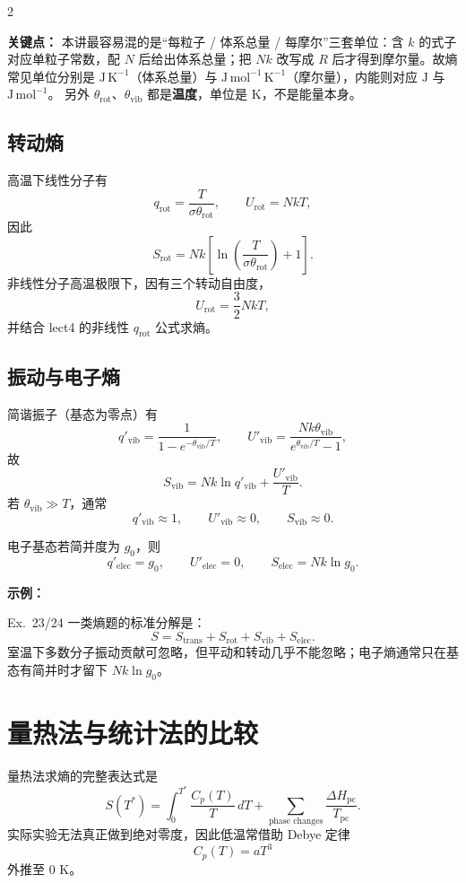 \documentclass[a4paper,9pt]{article}
\newenvironment{keypoint}
{\par\vspace{0.3em}\noindent\begin{tcolorbox}[colback=keybg,colframe=keycolor,boxrule=0.5pt,arc=2pt,left=2pt,right=2pt,top=2pt,bottom=2pt,boxsep=0pt]\noindent\textcolor{keycolor}{\textbf{关键点：}}}
{\end{tcolorbox}\par\vspace{0.3em}}
\newenvironment{examplebox}
{\par\vspace{0.3em}\noindent\begin{tcolorbox}[colback=boxbg,colframe=derivcolor,boxrule=0.5pt,arc=2pt,left=2pt,right=2pt,top=2pt,bottom=2pt,boxsep=0pt]\scriptsize\noindent\textcolor{derivcolor}{\textbf{示例：}}\par\setlength{\parskip}{0.1ex}\setlength{\itemsep}{0pt}\setlength{\parsep}{0pt}}
{\end{tcolorbox}\par\vspace{0.3em}}
\begin{document}
\begin{multicols}{2}
	\begin{keypoint}
		本讲最容易混的是“每粒子 / 体系总量 / 每摩尔”三套单位：含 $k$ 的式子对应单粒子常数，配 $N$ 后给出体系总量；把 $Nk$ 改写成 $R$ 后才得到摩尔量。故熵常见单位分别是 $\mathrm{J\,K^{-1}}$（体系总量）与 $\mathrm{J\,mol^{-1}\,K^{-1}}$（摩尔量），内能则对应 $\mathrm J$ 与 $\mathrm{J\,mol^{-1}}$。
		另外 $\theta_{\mathrm{rot}}$、$\theta_{\mathrm{vib}}$ 都是\textbf{温度}，单位是 K，不是能量本身。
	\end{keypoint}

	\subsection{转动熵}
	高温下线性分子有
	\[
		q_{\mathrm{rot}}=\frac{T}{\sigma\theta_{\mathrm{rot}}},
		\qquad U_{\mathrm{rot}}=NkT,
	\]
	因此
	\[
		S_{\mathrm{rot}}=Nk\left[\ln\left(\frac{T}{\sigma\theta_{\mathrm{rot}}}\right)+1\right].
	\]
	非线性分子高温极限下，因有三个转动自由度，
	\[
		U_{\mathrm{rot}}=\frac32NkT,
	\]
	并结合 lect4 的非线性 $q_{\mathrm{rot}}$ 公式求熵。

	\subsection{振动与电子熵}
	简谐振子（基态为零点）有
	\[
		q'_{\mathrm{vib}}=\frac{1}{1-e^{-\theta_{\mathrm{vib}}/T}},
		\qquad
		U'_{\mathrm{vib}}=\frac{Nk\theta_{\mathrm{vib}}}{e^{\theta_{\mathrm{vib}}/T}-1},
	\]
	故
	\[
		S_{\mathrm{vib}}=Nk\ln q'_{\mathrm{vib}}+\frac{U'_{\mathrm{vib}}}{T}.
	\]
	若 $\theta_{\mathrm{vib}}\gg T$，通常
	\[
		q'_{\mathrm{vib}}\approx 1,
		\qquad U'_{\mathrm{vib}}\approx 0,
		\qquad S_{\mathrm{vib}}\approx 0.
	\]

	电子基态若简并度为 $g_0$，则
	\[
		q'_{\mathrm{elec}}=g_0,
		\qquad U'_{\mathrm{elec}}=0,
		\qquad S_{\mathrm{elec}}=Nk\ln g_0.
	\]

	\begin{examplebox}
		Ex.~23/24 一类熵题的标准分解是：
		\[
			S=S_{\mathrm{trans}}+S_{\mathrm{rot}}+S_{\mathrm{vib}}+S_{\mathrm{elec}}.
		\]
		室温下多数分子振动贡献可忽略，但平动和转动几乎不能忽略；电子熵通常只在基态有简并时才留下 $Nk\ln g_0$。
	\end{examplebox}

	\section{量热法与统计法的比较}

	量热法求熵的完整表达式是
	\[
		S(T^*)=\int_0^{T^*}\frac{C_p(T)}{T}\,dT+\sum_{\text{phase changes}}\frac{\Delta H_{\mathrm{pc}}}{T_{\mathrm{pc}}}.
	\]
	实际实验无法真正做到绝对零度，因此低温常借助 Debye 定律
	\[
		C_p(T)=aT^3
	\]
	外推至 0 K。


\end{multicols}
\end{document}
